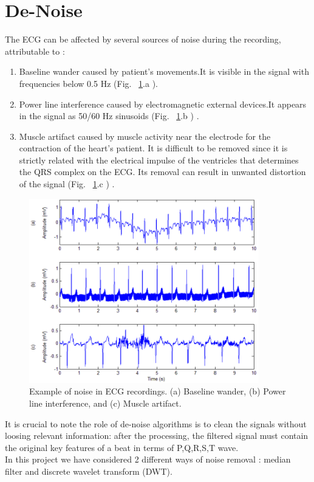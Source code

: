 \documentclass[LaM,binding=0.6cm]{sapthesis}
\begin{document}
\section{De-Noise}
The ECG  can be affected by several sources of noise during the recording, attributable to : 
\begin{enumerate}
\item Baseline wander caused by patient's movements.It is visible in the signal with frequencies below 0.5 Hz (Fig. ~\ref{fig:n1}.a ).
\item Power line interference caused by electromagnetic external devices.It appears in the signal as 50/60 Hz sinusoids (Fig. ~\ref{fig:n1}.b ) .
\item Muscle artifact caused by muscle activity near the electrode for the contraction of the heart's patient. It is difficult to be removed since it is strictly related with the electrical impulse of the ventricles that determines the QRS complex on the ECG. Its removal can result in unwanted distortion of the signal (Fig. ~\ref{fig:n1}.c ) .
\end{enumerate}
\begin{figure}[H]  \centering
	\includegraphics[width=100mm,scale=0.7]{noise.png}
	\caption{Example of noise in ECG recordings. (a) Baseline wander, (b) Power line interference, and (c) Muscle artifact. \cite{noise}}
	\label{fig:n1}
\end{figure}
It is crucial to note the role of de-noise algorithms is to clean the signals without loosing relevant information:  after the processing, the filtered signal must contain the original key features of a beat in terms of P,Q,R,S,T wave.\\In this project we have considered 2 different ways of noise removal : median filter and discrete wavelet transform (DWT).
\end{document}
